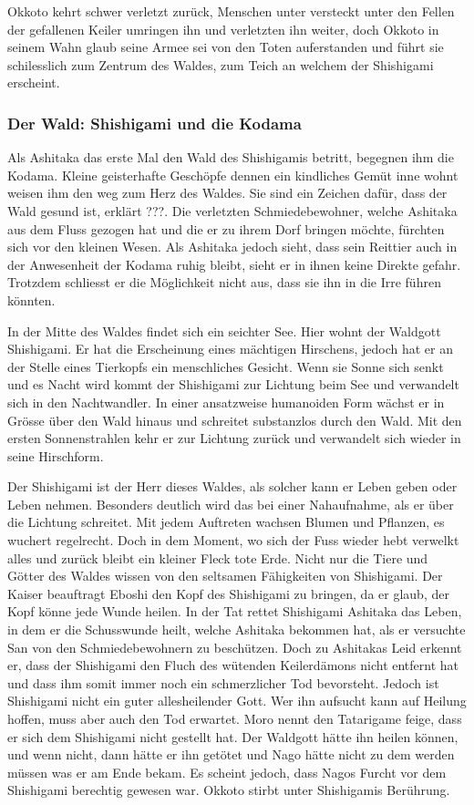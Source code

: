 Okkoto kehrt schwer verletzt zurück, Menschen unter versteckt unter den Fellen der gefallenen Keiler umringen ihn und verletzten ihn weiter, doch Okkoto in seinem Wahn glaub seine Armee sei von den Toten auferstanden und führt sie schilesslich zum Zentrum des Waldes, zum Teich an welchem der Shishigami erscheint.

\subsubsection*{Der Wald: Shishigami und die Kodama}
Als Ashitaka das erste Mal den Wald des Shishigamis betritt, begegnen ihm die Kodama. Kleine geisterhafte Geschöpfe dennen ein kindliches Gemüt inne wohnt weisen ihm den weg zum Herz des Waldes. Sie sind ein Zeichen dafür, dass der Wald gesund ist, erklärt ???. Die verletzten Schmiedebewohner, welche Ashitaka aus dem Fluss gezogen hat und die er zu ihrem Dorf bringen möchte, fürchten sich vor den kleinen Wesen. Als Ashitaka jedoch sieht, dass sein Reittier auch in der Anwesenheit der Kodama ruhig bleibt, sieht er in ihnen keine Direkte gefahr. Trotzdem schliesst er die Möglichkeit nicht aus, dass sie ihn in die Irre führen könnten.

In der Mitte des Waldes findet sich ein seichter See. Hier wohnt der Waldgott Shishigami. Er hat die Erscheinung eines mächtigen Hirschens, jedoch hat er an der Stelle eines Tierkopfs ein menschliches Gesicht. Wenn sie Sonne sich senkt und es Nacht wird kommt der Shishigami zur Lichtung beim See und verwandelt sich in den Nachtwandler. In einer ansatzweise humanoiden Form wächst er in Grösse über den Wald hinaus und schreitet substanzlos durch den Wald. Mit den ersten Sonnenstrahlen kehr er zur Lichtung zurück und verwandelt sich wieder in seine Hirschform. 

Der Shishigami ist der Herr dieses Waldes, als solcher kann er Leben geben oder Leben nehmen. Besonders deutlich wird das bei einer Nahaufnahme, als er über die Lichtung schreitet. Mit jedem Auftreten wachsen Blumen und Pflanzen, es wuchert regelrecht. Doch in dem Moment, wo sich der Fuss wieder hebt verwelkt alles und zurück bleibt ein kleiner Fleck tote Erde. Nicht nur die Tiere und Götter des Waldes wissen von den seltsamen Fähigkeiten von Shishigami. Der Kaiser beauftragt Eboshi den Kopf des Shishigami zu bringen, da er glaub, der Kopf könne jede Wunde heilen. In der Tat rettet Shishigami Ashitaka das Leben, in dem er die Schusswunde heilt, welche Ashitaka bekommen hat, als er versuchte San von den Schmiedebewohnern zu beschützen. Doch zu Ashitakas Leid erkennt er, dass der Shishigami den Fluch des wütenden Keilerdämons nicht entfernt hat und dass ihm somit immer noch ein schmerzlicher Tod bevorsteht. Jedoch ist Shishigami nicht ein guter allesheilender Gott. Wer ihn aufsucht kann auf Heilung hoffen, muss aber auch den Tod erwartet. Moro nennt den Tatarigame feige, dass er sich dem Shishigami nicht gestellt hat. Der Waldgott hätte ihn heilen können, und wenn nicht, dann hätte er ihn getötet und Nago hätte nicht zu dem werden müssen was er am Ende bekam. Es scheint jedoch, dass Nagos Furcht vor dem Shishigami berechtig gewesen war. Okkoto stirbt unter Shishigamis Berührung.

